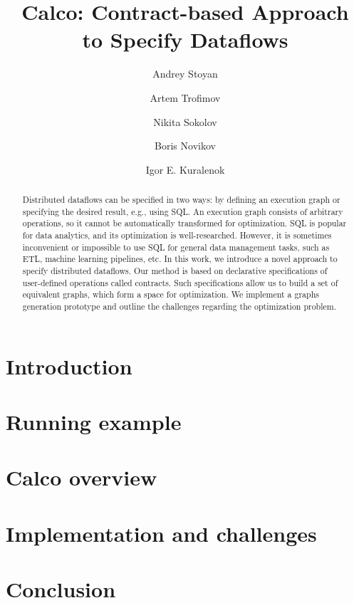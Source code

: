 \documentclass[runningheads]{llncs}
\begin{document}
%
\title{Calco: Contract-based Approach\\ to Specify Dataflows}
%
%
\author{Andrey Stoyan \and
Artem Trofimov \and
Nikita Sokolov \and
Boris Novikov \and
Igor E. Kuralenok}
%
%
%
\maketitle              %
%
\begin{abstract}
    Distributed dataflows can be specified in two ways: by defining an execution graph or specifying the desired result, e.g., using SQL.
    An execution graph consists of arbitrary operations, so it cannot be automatically transformed for optimization.
    SQL is popular for data analytics, and its optimization is well-researched.
    However, it is sometimes inconvenient or impossible to use SQL for general data management tasks, such as ETL, machine learning pipelines, etc.
    In this work, we introduce a novel approach to specify distributed dataflows.
    Our method is based on declarative specifications of user-defined operations called contracts.
    Such specifications allow us to build a set of equivalent graphs, which form a space for optimization.
    We implement a graphs generation prototype and outline the challenges regarding the optimization problem.

\end{abstract}
%
%
%
\section{Introduction}


\section{Running example}


\section{Calco overview}


\section{Implementation and challenges}


\section{Conclusion}




\end{document}
